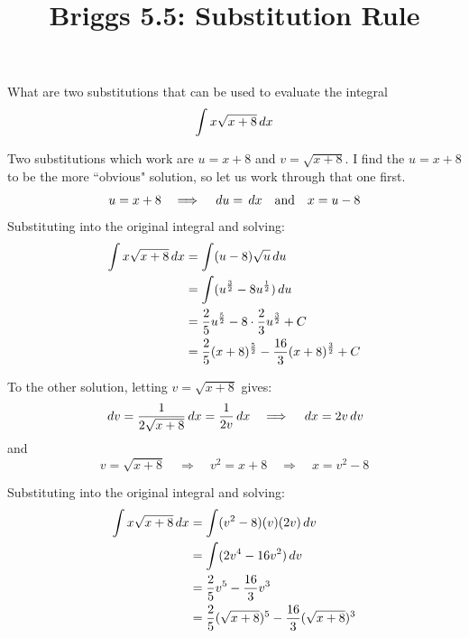 \documentclass[nooutcomes]{ximera}
\title{Briggs 5.5: Substitution Rule}
\begin{document}
\begin{abstract}
\end{abstract}
\maketitle

\begin{problem}

  What are two substitutions that can be used to evaluate the integral \begin{equation*} \int x \sqrt{x+8} \,d x \end{equation*}
	\begin{freeResponse}
    Two substitutions which work are $u=x+8$ and $v=\sqrt{x+8}$.
    I find the $u=x+8$ to be the more ``obvious" solution, so	let us work through that one first.
    \begin{equation*}
      u=x+8 \quad \Longrightarrow \quad \,d u = \,d x \quad \text{and} \quad x = u-8
		\end{equation*}
    Substituting into the original integral and solving:
		\begin{align*}
      \int x \sqrt{x+8} \,d x
      &= \int (u-8) \sqrt{u} \,d u  \\
      &= \int (u^{\frac{3}{2}} - 8u^{\frac{1}{2}} ) \,d u  \\
      &= \frac{2}{5} u^{\frac{5}{2}} - 8 \cdot \frac{2}{3} u^{\frac{3}{2}} + C  \\
      &= \frac{2}{5}(x+8)^{\frac{5}{2}} - \frac{16}{3} (x+8)^{\frac{3}{2}} + C
    \end{align*}

    To the other solution, letting $v=\sqrt{x+8}$ gives:
    \begin{equation*}
      \,d v = \frac{1}{2 \sqrt{x+8}} \,d x = \frac{1}{2v} \,d x 	\quad	\Longrightarrow \quad \,d x = 2v \,d v
    \end{equation*}
    and
    \begin{equation*}
       v = \sqrt{x+8} \quad \Longrightarrow \quad v^2 = x+8 \quad \Longrightarrow \quad x= v^2-8
    \end{equation*}

     Substituting into the original integral and solving:
    \begin{align*}
       \int x \sqrt{x+8} \,d x
       &= \int (v^2-8)(v)(2v)\,d v  \\
       &= \int (2v^4 - 16v^2) \,d v  \\
       &= \frac{2}{5} v^5 - \frac{16}{3} v^3  \\
       &= \frac{2}{5}(\sqrt{x+8})^5 - \frac{16}{3} (\sqrt{x+8})^3
    \end{align*}
  \end{freeResponse}
\end{problem}
\end{document}
